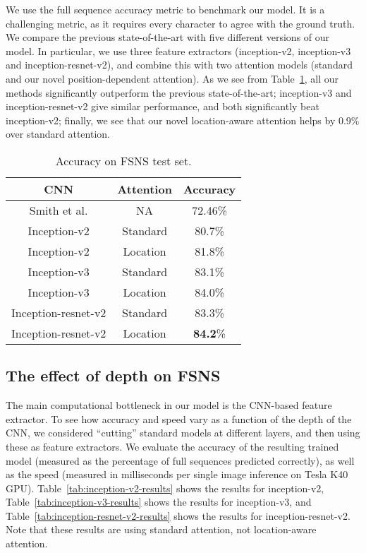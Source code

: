 \documentclass[conference]{IEEEtran}
\begin{document}
We use the full sequence accuracy metric to benchmark our model. It is
a challenging metric, as it requires every character to agree with the
ground truth.  
We compare
the previous state-of-the-art \cite{smith2016end}
with five different versions of our model.
In particular, we use three feature extractors
(inception-v2, inception-v3 and inception-resnet-v2),
and combine this 
 with two attention
models (standard and  our novel position-dependent attention).
As we see from Table~\ref{tab:results},
all our methods significantly outperform the
previous state-of-the-art;
inception-v3 and inception-resnet-v2  give similar performance,
and both significantly beat
inception-v2;
finally, 
we see that our novel location-aware attention helps by 0.9\%
over standard attention.

\begin{table}[t]
\caption{Accuracy on FSNS test set.}
\label{tab:results}
\begin{center}
\begin{tabular}{| c | c | c |}  \hline
  CNN & Attention & Accuracy \\ \hline
Smith et al. \cite{smith2016end} & NA & 72.46\% \\ 
Inception-v2 & Standard & 80.7\% \\  
Inception-v2 & Location & 81.8\% \\
Inception-v3 & Standard & 83.1\% \\  
Inception-v3 & Location & 84.0\% \\
Inception-resnet-v2 & Standard & 83.3\% \\  
Inception-resnet-v2 & Location & {\bf 84.2}\% \\
\hline
\end{tabular}
\end{center}
\end{table}


\subsection{The effect of depth on FSNS}
\label{sec:cuts}

The main computational bottleneck in our model is the CNN-based
feature extractor. To see how accuracy and speed vary as a function of
the depth of the CNN, we considered ``cutting'' standard models at
different layers, and then using these as feature extractors.
We evaluate the accuracy of the resulting
trained model (measured as the percentage  of
full sequences predicted correctly),
as well as the speed (measured in milliseconds per single image inference on Tesla K40 GPU).
Table~\ref{tab:inception-v2-results} shows the results for 
inception-v2,
Table~\ref{tab:inception-v3-results}
shows the results for inception-v3,
and Table~\ref{tab:inception-resnet-v2-results}
shows the results for inception-resnet-v2.
Note that these results are using standard attention,
not location-aware attention.
\end{document}
